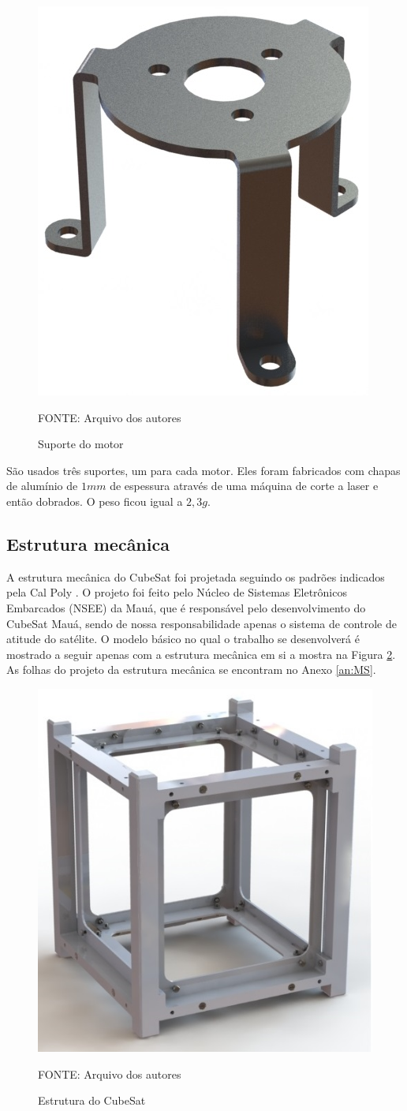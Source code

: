 \documentclass[
	12pt,				%
	openany,			%
	twoside,			%
	a4paper,			%
	english,			%
	french,				%
	spanish,			%
	brazil,				%
	oldfontcommands
	]{abntex2}
\begin{document}
\begin{figure}[th]
	\caption{Suporte do motor}
	\centering
	\includegraphics[width=0.45\linewidth]{./figs/Motor_Sup}
	
	\begin{small}
		FONTE: Arquivo dos autores
	\end{small}
	\label{fig:MS}
\end{figure}

\newpage

São usados três suportes, um para cada motor. Eles foram fabricados com chapas de alumínio de $1mm$ de espessura através de uma máquina de corte a laser e então dobrados. O peso ficou igual a $2,3g$.

\subsection{Estrutura mecânica}

A estrutura mecânica do CubeSat foi projetada seguindo os padrões indicados pela Cal Poly \cite{CalPoly}. O projeto foi feito pelo Núcleo de Sistemas Eletrônicos Embarcados (NSEE) da Mauá, que é responsável pelo desenvolvimento do CubeSat Mauá, sendo de nossa responsabilidade apenas o sistema de controle de atitude do satélite. O modelo básico no qual o trabalho se desenvolverá é mostrado a seguir apenas com a estrutura mecânica em si a mostra na Figura \ref{fig:Frame}. As folhas do projeto da estrutura mecânica se encontram no Anexo \ref{an:MS}.

\begin{figure}[th]
	\caption{Estrutura do CubeSat}
	\centering
	\includegraphics[width=0.5\linewidth]{./figs/Frame}
	
	\begin{small}
		FONTE: Arquivo dos autores
	\end{small}
	\label{fig:Frame}
\end{figure}
\end{document}
